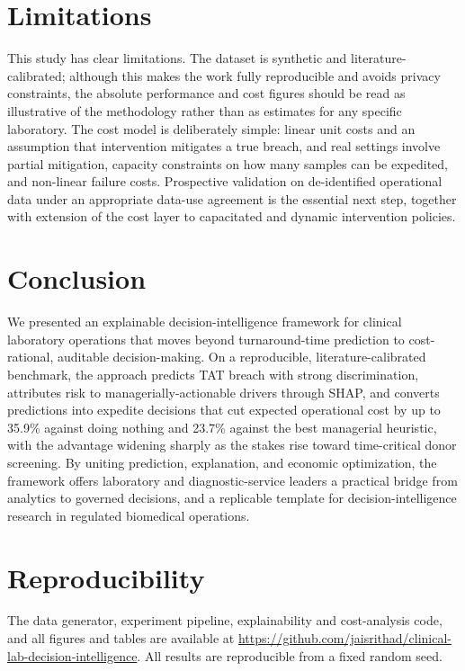 \documentclass[journal]{IEEEtran}
\begin{document}
\section{Limitations}\label{sec:limits}
This study has clear limitations. The dataset is synthetic and literature-calibrated;
although this makes the work fully reproducible and avoids privacy constraints, the
absolute performance and cost figures should be read as illustrative of the
methodology rather than as estimates for any specific laboratory. The cost model
is deliberately simple: linear unit costs and an assumption that intervention
mitigates a true breach, and real settings involve partial mitigation, capacity
constraints on how many samples can be expedited, and non-linear failure costs.
Prospective validation on de-identified operational data under an appropriate
data-use agreement is the essential next step, together with extension of the cost
layer to capacitated and dynamic intervention policies.

\section{Conclusion}\label{sec:conclusion}
We presented an explainable decision-intelligence framework for clinical
laboratory operations that moves beyond turnaround-time prediction to
cost-rational, auditable decision-making. On a reproducible, literature-calibrated
benchmark, the approach predicts TAT breach with strong discrimination, attributes
risk to managerially-actionable drivers through SHAP, and converts predictions into
expedite decisions that cut expected operational cost by up to 35.9\% against doing
nothing and 23.7\% against the best managerial heuristic, with the advantage
widening sharply as the stakes rise toward time-critical donor screening. By
uniting prediction, explanation, and economic optimization, the framework offers
laboratory and diagnostic-service leaders a practical bridge from analytics to
governed decisions, and a replicable template for decision-intelligence research
in regulated biomedical operations.

\section*{Reproducibility}
The data generator, experiment pipeline, explainability and cost-analysis code,
and all figures and tables are available at
\url{https://github.com/jaisrithad/clinical-lab-decision-intelligence}.
All results are reproducible from a fixed random seed.
\end{document}
